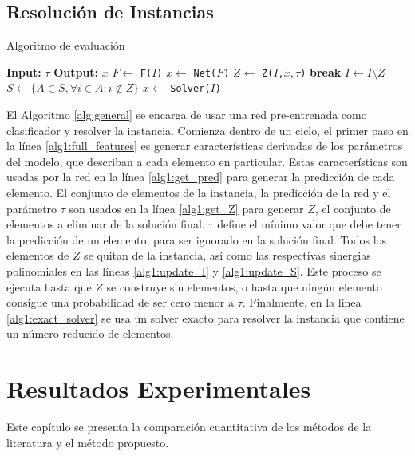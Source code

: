 \documentclass[spanish, a4paper, 12pt, openany,final]{book}
\begin{document}
 
\section{Resolución de Instancias}
 
 \begin{algorithm}[H]
 	\caption{Algoritmo de evaluación}\label{alg:general}
 	\begin{algorithmic}[1]
 		\Statex \textbf{Input:} $\tau$
 		\Statex \textbf{Output:} $x$
 		\Loop
 		\State $F \gets$ \texttt{F($I$)}\label{alg1:full_features}
 		\State $\tilde{x} \gets$ \texttt{Net($F$)} \label{alg1:get_pred}
 		\State $Z \gets$ \texttt{Z($I$,$\tilde{x},\tau$)} \label{alg1:get_Z}
 		 \label{alg1:break_condition}
 		\State \textbf{break}
 		\EndIf
 		\State $I \gets I\setminus Z$ 								\label{alg1:update_I}
 		\State $S \gets \{A \in S, \forall i \in A: i \notin Z\}$  \label{alg1:update_S}
 		\EndLoop
 		\State $x \gets$ \texttt{Solver($I$)} \label{alg1:exact_solver} 
 	\end{algorithmic}
 \end{algorithm}
 
 
 
 El Algoritmo \ref{alg:general} se encarga de usar una red pre-entrenada como clasificador y resolver la instancia. Comienza dentro de un ciclo, el primer paso en la línea \ref{alg1:full_features} es generar características derivadas de los parámetros del modelo, que describan a cada elemento en particular. Estas características son usadas por la red en la línea \ref{alg1:get_pred} para generar la predicción de cada elemento. El conjunto de elementos de la instancia, la predicción de la red y el parámetro $\tau$ son usados en la línea \ref{alg1:get_Z} para generar $Z$, el conjunto de elementos a eliminar de la solución final. $\tau$ define el mínimo valor que debe tener la predicción de un elemento, para ser ignorado en la solución final. Todos los elementos de $Z$ se quitan de la instancia, así como las respectivas sinergias polinomiales en las líneas \ref{alg1:update_I} y \ref{alg1:update_S}. Este proceso se ejecuta hasta que $Z$ se construye sin elementos, o hasta que ningún elemento consigue una probabilidad de ser cero menor a $\tau$. Finalmente, en la linea \ref{alg1:exact_solver} se usa un solver exacto para resolver la instancia que contiene un número reducido de elementos.
 
 
\clearpage
\chapter{Resultados Experimentales}
Este capítulo se presenta la comparación cuantitativa de los métodos de la literatura y el método propuesto.
\end{document}
